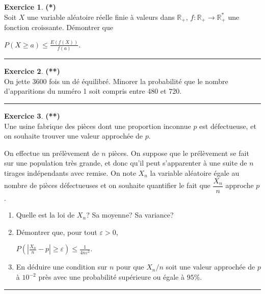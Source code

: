 \documentclass[a4paper,11pt]{article}
\theoremstyle{definition}
\newtheorem{exo}{Exercice} %
\begin{document}
\begin{minipage}{1\linewidth}\begin{minipage}[t]{0.48\linewidth}\raggedright



\begin{exo}\textbf{(*)}\quad\\[0.2cm]
	Soit $X$ une variable aléatoire réelle finie à valeurs dans $\mathbb R_+$, $f:\mathbb R_+\to\mathbb R_+^*$ une fonction croissante. Démontrer que
	
	$P(X\geq a)\leq \frac{E(f(X))}{f(a)}.$	\centering\rule{1\linewidth}{0.6pt}\end{exo} 


\begin{exo}\textbf{(**)}\quad\\[0.2cm]
	On jette 3600 fois un dé équilibré. Minorer la probabilité que le nombre d'apparitions du numéro 1 soit compris entre 480 et 720.
	
	\centering\rule{1\linewidth}{0.6pt}\end{exo}

\begin{exo}\textbf{(**)}\quad\\[0.2cm]
	Une usine fabrique des pièces dont une proportion inconnue $p$ est défectueuse, et on souhaite trouver une valeur approchée de $p$. 
	\end{exo}







\end{minipage}\hfill\vrule\hfill\begin{minipage}[t]{0.48\linewidth}\raggedright
On effectue un prélèvement de $n$ pièces. On suppose que le prélèvement se fait sur une population très grande, et donc qu'il peut s'apparenter à une suite de $n$  tirages indépendants avec remise. On note $X_n$ la variable aléatoire égale au nombre de pièces défectueuses et on souhaite quantifier le fait que $\dfrac{X_n}{n}$ approche $p$.
\begin{enumerate}
	\item Quelle est la loi de $X_n$? Sa moyenne? Sa variance?
	\item Démontrer que, pour tout $\varepsilon>0$,\\[0.5cm]
	\begin{center}	
	 $\displaystyle P\left(\left|\frac{X_n}n-p\right|\geq\varepsilon\right)\leq\frac 1{4n\varepsilon^2}.$
	\end{center}
	\item En déduire une condition sur $n$ pour que $X_n/n$ soit une valeur approchée de $p$ à $10^{-2}$ près avec une probabilité supérieure ou égale à $95\%$.
\end{enumerate}
	
	\centering\rule{1\linewidth}{0.6pt}




\end{minipage}\end{minipage} \newpage
\end{document}
